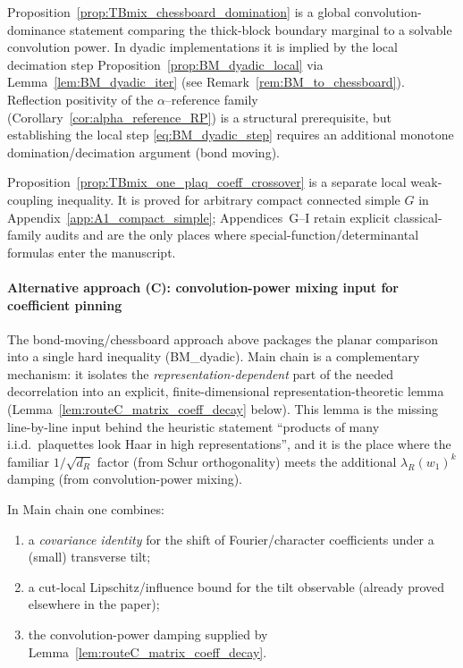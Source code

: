 \begin{remark}
Proposition~\ref{prop:TBmix_chessboard_domination} is a global convolution-dominance statement comparing the thick-block boundary marginal to a solvable convolution power.
In dyadic implementations it is implied by the local decimation step Proposition~\ref{prop:BM_dyadic_local} via Lemma~\ref{lem:BM_dyadic_iter}
(see Remark~\ref{rem:BM_to_chessboard}).
Reflection positivity of the $\alpha$--reference family (Corollary~\ref{cor:alpha_reference_RP}) is a structural prerequisite,
but establishing the local step \eqref{eq:BM_dyadic_step} requires an additional monotone domination/decimation argument (bond moving).

Proposition~\ref{prop:TBmix_one_plaq_coeff_crossover} is a separate local weak-coupling inequality.
It is proved for arbitrary compact connected simple $G$ in Appendix~\ref{app:A1_compact_simple}; Appendices~G--I retain explicit classical-family audits and are the only places where special-function/determinantal formulas enter the manuscript.
\end{remark}

\paragraph{Alternative approach (C): convolution-power mixing input for coefficient pinning}\label{sec:TBmix_routeC}

The bond-moving/chessboard approach above packages the planar comparison into a single hard inequality (BM\_dyadic).
Main chain is a complementary mechanism: it isolates the \emph{representation-dependent} part of the needed decorrelation
into an explicit, finite-dimensional representation-theoretic lemma (Lemma~\ref{lem:routeC_matrix_coeff_decay} below).
This lemma is the missing line-by-line input behind the heuristic statement
``products of many i.i.d.\ plaquettes look Haar in high representations'', and it is the place where
the familiar $1/\sqrt{d_R}$ factor (from Schur orthogonality) meets the additional
$\lambda_R(w_1)^k$ damping (from convolution-power mixing).

\medskip
\noindent
In Main chain one combines:
\begin{enumerate}[label=(\roman*)]
\item a \emph{covariance identity} for the shift of Fourier/character coefficients under a (small) transverse tilt;
\item a cut-local Lipschitz/influence bound for the tilt observable (already proved elsewhere in the paper);
\item the convolution-power damping supplied by Lemma~\ref{lem:routeC_matrix_coeff_decay}.
\end{enumerate}

